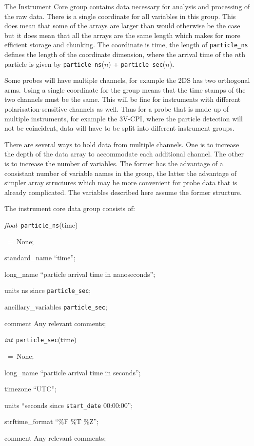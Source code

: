 \documentclass[12pt,a4paper]{article}
\newcommand{\varlabel}[4][None]%
    {\footnotesize\textit{#2}~\texttt{#3}#4\ifthenelse{\equal{#1}{None}}%
                                           {\rule{0pt}{1ex}}%
                                           {~=~#1;}\normalsize}
\newlength{\varitemwidth}
\newlength{\Mylen}
\newcommand{\varlistlabel}[1]%
    {\settowidth{\Mylen}{#1}%
     \ifthenelse{\lengthtest{\Mylen>\labelwidth}}%
                {\parbox[b]{\labelwidth}%
                {\makebox[0pt][l]{#1}
                 \mbox{}\\}}%
                {#1}%
     \hfil\relax}
\newenvironment{varlist}[4][None]%
    {\vspace{1ex}
     \noindent
     \varlabel[#1]{#2}{#3}{#4}
     \begin{list}{}{%
        \footnotesize%
        \renewcommand{\makelabel}[1]{\varlistlabel{\quad \texttt{#3:##1}~=}}%
        \setlength{\parsep}{0ex}%
        \setlength{\partopsep}{0.25ex}%
        \setlength{\topsep}{0.25ex}%
        \setlength{\itemsep}{0.25ex}%
        \setlength{\itemindent}{0cm}%
        \setlength{\listparindent}{0cm}%
        \setlength{\labelwidth}{\varitemwidth}%
        \setlength{\labelsep}{0em}%
        \setlength{\leftmargin}{\labelwidth+\labelsep}%
        \setlength{\rightmargin}{0cm}}}%
    {\normalsize\end{list}}
\begin{document}
The Instrument Core group contains data necessary for analysis and processing of the raw data. There is a single coordinate for all variables in this group. This does mean that some of the arrays are larger than would otherwise be the case but it does mean that all the arrays are the same length which makes for more efficient storage and chunking. The coordinate is time, the length of \texttt{particle\_ns} defines the length of the coordinate dimension, where the arrival time of the $n$th particle is given by \texttt{particle\_ns}($n$) + \texttt{particle\_sec}($n$).
\par
Some probes will have multiple channels, for example the 2DS has two orthogonal arms. Using a single coordinate for the group means that the time stamps of the two channels must be the same. This will be fine for instruments with different polarisation-sensitive channels as well. Thus for a probe that is made up of multiple instruments, for example the 3V-CPI, where the particle detection will not be coincident, data will have to be split into different instrument groups.
\par
There are several ways to hold data from multiple channels. One is to increase the depth of the data array to accommodate each additional channel. The other is to increase the number of variables. The former has the advantage of a consistant number of variable names in the group, the latter the advantage of simpler array structures which may be more convenient for probe data that is already complicated. The variables described here assume the former structure.
\par
The instrument core data group consists of:

\begin{varlist}{float}{particle\_ns}{(time)}
\item[standard\_name] ``time'';
\item[long\_name] ``particle arrival time in nanoseconds'';
\item[units] ns since \texttt{particle\_sec};
\item[ancillary\_variables] \texttt{particle\_sec};
\item[comment] Any relevant comments;
\end{varlist}

\begin{varlist}{int}{particle\_sec}{(time)}
\item[long\_name] ``particle arrival time in seconds'';
\item[timezone] ``UTC'';
\item[units] ``seconds since \texttt{start\_date} 00:00:00'';
\item[strftime\_format] ``\%F \%T \%Z'';
\item[comment] Any relevant comments;
\end{varlist}
\end{document}

